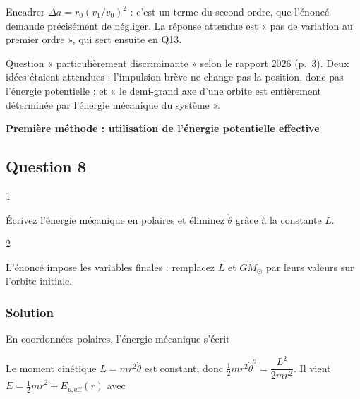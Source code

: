 \documentclass[11pt,a4paper]{article}
\newcommand{\equationajustee}[1]{%
  \sbox{\boiteequation}{$\displaystyle #1$}%
  \ifdim\wd\boiteequation>\linewidth
    \[\resizebox{\linewidth}{!}{\usebox{\boiteequation}}\]%
  \else
    \[#1\]%
  \fi}
\begin{document}
\begin{piege}

Encadrer \(\Delta a=r_0(v_1/v_0)^2\) : c'est un terme du second ordre, que l'énoncé demande précisément de négliger. La réponse attendue est « pas de variation au premier ordre », qui sert ensuite en Q13.

\end{piege}

\begin{jury}

Question « particulièrement discriminante » selon le rapport 2026 (p.~3). Deux idées étaient attendues : l'impulsion brève ne change pas la position, donc pas l'énergie potentielle ; et « le demi-grand axe d'une orbite est entièrement déterminée par l'énergie mécanique du système ».

\end{jury}

\textbf{Première méthode : utilisation de l'énergie potentielle effective}

\hypertarget{question-8}{%
\subsection{Question 8}\label{question-8}}

\begin{indication}{1}

Écrivez l'énergie mécanique en polaires et éliminez \(\dot\theta\) grâce à la constante \(L\).

\end{indication}

\begin{indication}{2}

L'énoncé impose les variables finales : remplacez \(L\) et \(GM_\odot\) par leurs valeurs sur l'orbite initiale.

\end{indication}

\hypertarget{solution-7}{%
\subsubsection{Solution}\label{solution-7}}

En coordonnées polaires, l'énergie mécanique s'écrit

\equationajustee{E=\tfrac12m(\dot r^2+r^2\dot\theta^2)-\frac{GM_\odot m}{r} .}

Le moment cinétique \(L=mr^2\dot\theta\) est constant, donc \(\frac12mr^2\dot\theta^2=\dfrac{L^2}{2mr^2}\). Il vient \(E=\frac12m\dot r^2+E_{p,\text{eff}}(r)\) avec
\end{document}
